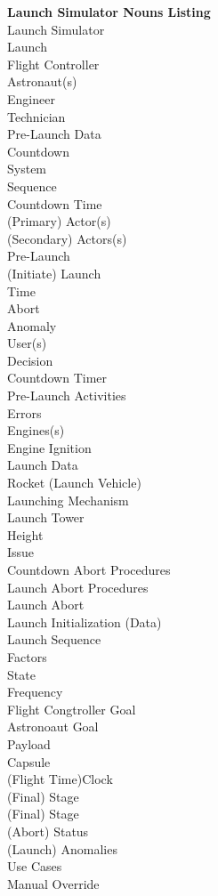 \documentclass[letterpaper]{article}
\begin{document}
\noindent
\textbf{Launch Simulator Nouns Listing}\\
Launch Simulator\\
Launch\\
Flight Controller\\
Astronaut(s)\\
Engineer\\
Technician\\
Pre-Launch Data\\
Countdown\\
System\\
Sequence\\
Countdown Time\\
(Primary) Actor(s)\\
(Secondary) Actors(s)\\
Pre-Launch\\
(Initiate) Launch\\
Time\\
Abort\\
Anomaly\\
User(s)\\
Decision\\
Countdown Timer\\
Pre-Launch Activities\\
Errors\\
Engines(s)\\
Engine Ignition\\
Launch Data\\
Rocket (Launch Vehicle)\\
Launching Mechanism\\
Launch Tower\\
Height\\
Issue\\
Countdown Abort Procedures\\
Launch Abort Procedures\\
Launch Abort\\
Launch Initialization (Data)\\
Launch Sequence\\
Factors\\
State\\
Frequency\\
Flight Congtroller Goal\\
Astronoaut Goal\\
Payload\\
Capsule\\
(Flight Time)Clock\\
(Final) Stage\\
(Final) Stage\\
(Abort) Status\\
(Launch) Anomalies\\
Use Cases\\
Manual Override\\
\end{document}
